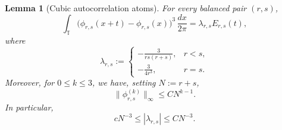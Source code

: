 \documentclass[11pt]{amsart}
\newtheorem{lemma}[theorem]{Lemma}
\theoremstyle{definition}
\theoremstyle{remark}
\newcommand{\T}{\mathbb T}
\begin{document}
\begin{lemma}[Cubic autocorrelation atoms]\label{lem:cubic-atoms}
For every balanced pair $(r,s)$,
\begin{equation}\label{eq:cubic-atom}
 \int_\T
 \big(\phi_{r,s}(x+t)-\phi_{r,s}(x)\big)^3\,\frac{dx}{2\pi}
 =\lambda_{r,s}E_{r,s}(t),
\end{equation}
where
\begin{equation}\label{eq:lambda-rs}
 \lambda_{r,s}:=
 \begin{cases}
 \displaystyle-\frac{3}{rs(r+s)},&r<s,\\[1.5ex]
 \displaystyle-\frac{3}{4r^3},&r=s.
 \end{cases}
\end{equation}
Moreover, for $0\leq k\leq3$, we have, setting $N:=r+s$,
\begin{equation}\label{eq:phi-derivative-bound}
 \|\phi_{r,s}^{(k)}\|_\infty\leq C N^{k-1}.
\end{equation}
In particular,
\begin{equation}\label{eq:lambda-comparable}
 cN^{-3}\leq|\lambda_{r,s}|\leq CN^{-3}.
\end{equation}
\end{lemma}
\end{document}
